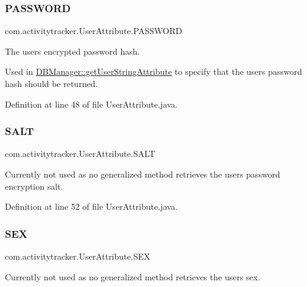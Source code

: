 \subsubsection{\texorpdfstring{P\+A\+S\+S\+W\+O\+RD}{PASSWORD}}
{\footnotesize\ttfamily com.\+activitytracker.\+User\+Attribute.\+P\+A\+S\+S\+W\+O\+RD}

The user\textquotesingle{}s encrypted password hash.

Used in \mbox{\hyperlink{classcom_1_1activitytracker_1_1_d_b_manager_a20f726c054d6c8a6fc3ce629d87f1114}{D\+B\+Manager\+::get\+User\+String\+Attribute}} to specify that the user\textquotesingle{}s password hash should be returned. 

Definition at line 48 of file User\+Attribute.\+java.

\mbox{\label{enumcom_1_1activitytracker_1_1_user_attribute_acd286be9d131a84a2be02e1cdac4c848}} 
\subsubsection{\texorpdfstring{S\+A\+LT}{SALT}}
{\footnotesize\ttfamily com.\+activitytracker.\+User\+Attribute.\+S\+A\+LT}

Currently not used as no generalized method retrieves the user\textquotesingle{}s password encryption salt. 

Definition at line 52 of file User\+Attribute.\+java.

\mbox{\label{enumcom_1_1activitytracker_1_1_user_attribute_a53fe928fb805b69c606a351aac257558}} 
\subsubsection{\texorpdfstring{S\+EX}{SEX}}
{\footnotesize\ttfamily com.\+activitytracker.\+User\+Attribute.\+S\+EX}

Currently not used as no generalized method retrieves the user\textquotesingle{}s sex. 

